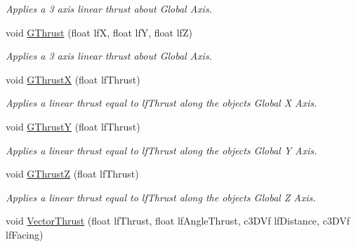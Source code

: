 \begin{DoxyCompactItemize}
\begin{DoxyCompactList}\small\item\em Applies a 3 axis linear thrust about Global Axis. \end{DoxyCompactList}\item 
\hypertarget{classc_momentum_a634a0e4b2dd11aedb9e0396e381620f7}{
void \hyperlink{classc_momentum_a634a0e4b2dd11aedb9e0396e381620f7}{GThrust} (float lfX, float lfY, float lfZ)}
\label{classc_momentum_a634a0e4b2dd11aedb9e0396e381620f7}

\begin{DoxyCompactList}\small\item\em Applies a 3 axis linear thrust about Global Axis. \end{DoxyCompactList}\item 
\hypertarget{classc_momentum_accf174f3d17297f2b13b32c69465459f}{
void \hyperlink{classc_momentum_accf174f3d17297f2b13b32c69465459f}{GThrustX} (float lfThrust)}
\label{classc_momentum_accf174f3d17297f2b13b32c69465459f}

\begin{DoxyCompactList}\small\item\em Applies a linear thrust equal to lfThrust along the objects Global X Axis. \end{DoxyCompactList}\item 
\hypertarget{classc_momentum_a0c0c8b1a60ecd2f25f75cad13e09d57f}{
void \hyperlink{classc_momentum_a0c0c8b1a60ecd2f25f75cad13e09d57f}{GThrustY} (float lfThrust)}
\label{classc_momentum_a0c0c8b1a60ecd2f25f75cad13e09d57f}

\begin{DoxyCompactList}\small\item\em Applies a linear thrust equal to lfThrust along the objects Global Y Axis. \end{DoxyCompactList}\item 
\hypertarget{classc_momentum_a3d140c25bb390b1b37a93bc917fb27c6}{
void \hyperlink{classc_momentum_a3d140c25bb390b1b37a93bc917fb27c6}{GThrustZ} (float lfThrust)}
\label{classc_momentum_a3d140c25bb390b1b37a93bc917fb27c6}

\begin{DoxyCompactList}\small\item\em Applies a linear thrust equal to lfThrust along the objects Global Z Axis. \end{DoxyCompactList}\item 
\hypertarget{classc_momentum_af95b5ba2c24f9fb6964ca2b7466c0b1a}{
void \hyperlink{classc_momentum_af95b5ba2c24f9fb6964ca2b7466c0b1a}{VectorThrust} (float lfThrust, float lfAngleThrust, c3DVf lfDistance, c3DVf lfFacing)}
\label{classc_momentum_af95b5ba2c24f9fb6964ca2b7466c0b1a}


\end{DoxyCompactItemize}
